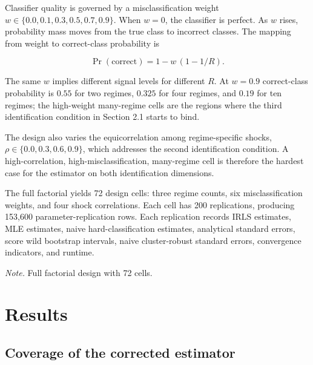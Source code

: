 \documentclass[
  12pt,
  letterpaper]{article}
\begin{document}
Classifier quality is governed by a misclassification weight
\(w \in \{0.0, 0.1, 0.3, 0.5, 0.7, 0.9\}\). When \(w = 0\), the
classifier is perfect. As \(w\) rises, probability mass moves from the
true class to incorrect classes. The mapping from weight to
correct-class probability is

\[
\Pr(\text{correct}) = 1 - w \, (1 - 1/R).
\]

The same \(w\) implies different signal levels for different \(R\). At
\(w = 0.9\) correct-class probability is \(0.55\) for two regimes,
\(0.325\) for four regimes, and \(0.19\) for ten regimes; the
high-weight many-regime cells are the regions where the third
identification condition in Section 2.1 starts to bind.

The design also varies the equicorrelation among regime-specific shocks,
\(\rho \in \{0.0, 0.3, 0.6, 0.9\}\), which addresses the second
identification condition. A high-correlation, high-misclassification,
many-regime cell is therefore the hardest case for the estimator on both
identification dimensions.

The full factorial yields 72 design cells: three regime counts, six
misclassification weights, and four shock correlations. Each cell has
200 replications, producing 153,600 parameter-replication rows. Each
replication records IRLS estimates, MLE estimates, naive
hard-classification estimates, analytical standard errors, score wild
bootstrap intervals, naive cluster-robust standard errors, convergence
indicators, and runtime.

\begin{table}[htbp]
\centering
\caption{Monte Carlo design summary.}
\label{tab:design}

\begin{flushleft}
{\small \textit{Note.} Full factorial design with 72 cells.}
\end{flushleft}
\end{table}

\FloatBarrier

\section{Results}\label{results}

\subsection{Coverage of the corrected
estimator}\label{coverage-of-the-corrected-estimator}
\end{document}
